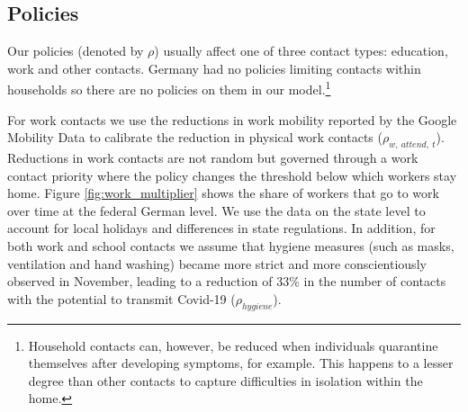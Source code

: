\subsection{Policies}
\label{subsec:policies}

Our policies (denoted by $\rho$) usually affect one of three contact types: education,
work and other contacts.
Germany had no policies limiting contacts within households so there are no policies on
them in our model.\footnote{Household contacts can, however, be reduced when individuals
quarantine themselves after developing symptoms, for example. This happens to a lesser
degree than other contacts to capture difficulties in isolation within the home.}


For work contacts we use the reductions in work mobility reported by the Google Mobility
Data \citep{Google2021} to calibrate the reduction in physical work contacts
($\rho_{w,\:attend,\:t}$). Reductions in work contacts are not random but governed
through a work contact priority where the policy changes the threshold below which
workers stay home. Figure \ref{fig:work_multiplier} shows the share of workers that go to
work over time at the federal German level. We use the data on the state level to account
for local holidays and differences in state regulations.
In addition, for both work and school contacts we assume that hygiene measures (such as
masks, ventilation and hand washing) became more strict and more conscientiously observed
in November, leading to a reduction of 33\% in the number of contacts with the potential
to transmit Covid-19 ($\rho_{hygiene}$).


